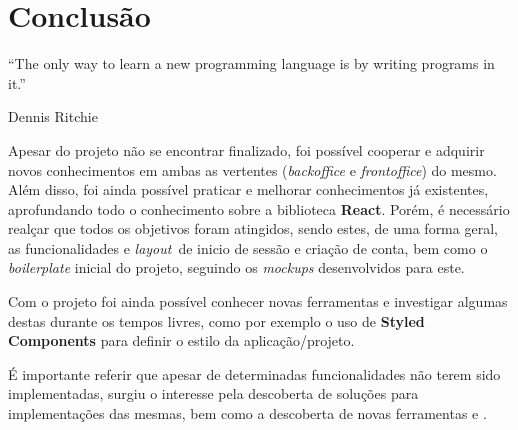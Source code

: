 \chapter{Conclusão}

\begin{flushright}
	\begin{quotebox50}
		\large
		“The only way to learn a new programming language is by writing programs in it.”

		\tcblower
		Dennis Ritchie
	\end{quotebox50}
\end{flushright}

Apesar do projeto não se encontrar finalizado, foi possível cooperar e adquirir novos conhecimentos em ambas as vertentes (\textit{backoffice} e \textit{frontoffice}) do mesmo. Além disso, foi ainda possível praticar e melhorar conhecimentos já existentes, aprofundando todo o conhecimento sobre a biblioteca \textbf{React}. Porém, é necessário realçar que todos os objetivos foram atingidos, sendo estes, de uma forma geral, as funcionalidades e \textit{layout} de inicio de sessão e criação de conta, bem como o \textit{boilerplate} inicial do projeto, seguindo os \textit{mockups} desenvolvidos para este.

Com o projeto foi ainda possível conhecer novas ferramentas e investigar algumas destas durante os tempos livres, como por exemplo o uso de \textbf{Styled Components} para definir o estilo da aplicação/projeto.

É importante referir que apesar de determinadas funcionalidades não terem sido implementadas, surgiu o interesse pela descoberta de soluções para implementações das mesmas, bem como a descoberta de novas ferramentas e \textit{}.



